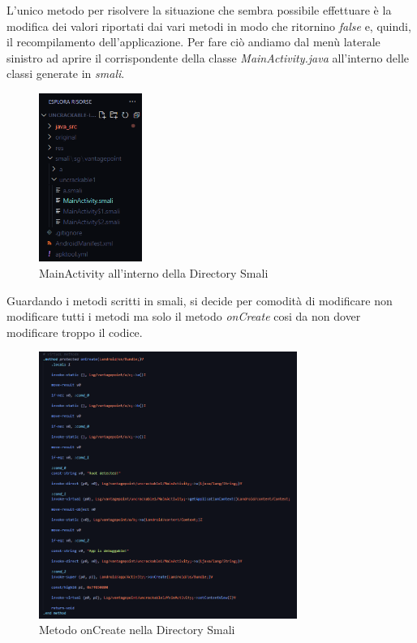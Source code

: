 \documentclass{article}
\begin{document}
L'unico metodo per risolvere la situazione che sembra possibile effettuare è la modifica dei valori riportati dai vari metodi in 
modo che ritornino \textit{false} e, quindi, il recompilamento dell'applicazione.
Per fare ciò andiamo dal menù laterale sinistro ad aprire il corrispondente della classe \textit{MainActivity.java} all'interno delle classi 
generate in \emph{smali}.
\begin{figure}[htbp]
    \centering
    \includegraphics[width=0.3\textwidth]{./uncrackable1/smaliDir.png}
    \captionsetup{labelformat=empty}
    \caption{MainActivity all'interno della Directory Smali}
    \label{fig:smaliDir}
\end{figure}
Guardando i metodi scritti in smali, si decide per comodità di modificare non modificare tutti i metodi ma solo il metodo \emph{onCreate} 
cosi da non dover modificare troppo il codice.
\begin{figure}[h]
    \centering
    \includegraphics[width=0.75\textwidth]{./uncrackable1/OnCreateSmali.png}
    \captionsetup{labelformat=empty}
    \caption{Metodo onCreate nella Directory Smali}
    \label{fig:onCreateSmali}
\end{figure}
\end{document}
